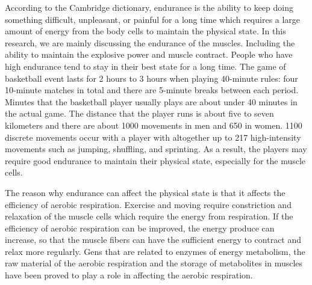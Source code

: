 \documentclass[man,floatsintext]{apa7}
\begin{document}
According to the Cambridge dictionary, endurance is the ability to keep doing something difficult, unpleasant, or painful for a long time which requires a large amount of energy from the body cells to maintain the physical state. In this research, we are mainly discussing the endurance of the muscles. Including the ability to maintain the explosive power and muscle contract. People who have high endurance tend to stay in their best state for a long time. The game of basketball event lasts for 2 hours to 3 hours when playing 40-minute rules: four 10-minute matches in total and there are 5-minute breaks between each period. Minutes that the basketball player usually plays are about under 40 minutes in the actual game. The distance that the player runs is about five to seven kilometers and there are about 1000 movements in men and 650 in women. 1100 discrete movements occur with a player with altogether up to 217 high-intensity movements such as jumping, shuffling, and sprinting.\autocite[13-14]{raduScienceBasketball2018} As a result, the players may require good endurance to maintain their physical state, especially for the muscle cells. 

The reason why endurance can affect the physical state is that it affects the efficiency of aerobic respiration.\autocite{forsmanh.KoripalloilijanFyysinenHarjoittelu2024} Exercise and moving require constriction and relaxation of the muscle cells which require the energy from respiration. If the efficiency of aerobic respiration can be improved, the energy produce can increase, so that the muscle fibers can have the sufficient energy to contract and relax more regularly. Gens that are related to enzymes of energy metabolism, the raw material of the aerobic respiration and the storage of metabolites in muscles have been proved to play a role in affecting the aerobic respiration.\autocite{ahmetovGenesAthleticPerformance2016}
\end{document}

